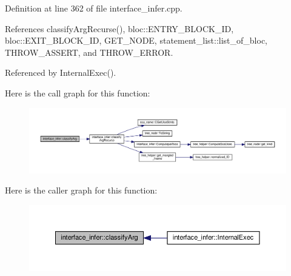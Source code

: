 Definition at line 362 of file interface\+\_\+infer.\+cpp.



References classify\+Arg\+Recurse(), bloc\+::\+E\+N\+T\+R\+Y\+\_\+\+B\+L\+O\+C\+K\+\_\+\+ID, bloc\+::\+E\+X\+I\+T\+\_\+\+B\+L\+O\+C\+K\+\_\+\+ID, G\+E\+T\+\_\+\+N\+O\+DE, statement\+\_\+list\+::list\+\_\+of\+\_\+bloc, T\+H\+R\+O\+W\+\_\+\+A\+S\+S\+E\+RT, and T\+H\+R\+O\+W\+\_\+\+E\+R\+R\+OR.



Referenced by Internal\+Exec().

Here is the call graph for this function\+:
\nopagebreak
\begin{figure}[H]
\begin{center}
\leavevmode
\includegraphics[width=350pt]{d9/d8a/classinterface__infer_afb57e923fa70473d88a87f9d9a4482c1_cgraph}
\end{center}
\end{figure}
Here is the caller graph for this function\+:
\nopagebreak
\begin{figure}[H]
\begin{center}
\leavevmode
\includegraphics[width=350pt]{d9/d8a/classinterface__infer_afb57e923fa70473d88a87f9d9a4482c1_icgraph}
\end{center}
\end{figure}
\mbox{\label{classinterface__infer_ab036c9a72e643238236d229c1eb875a6}} 
